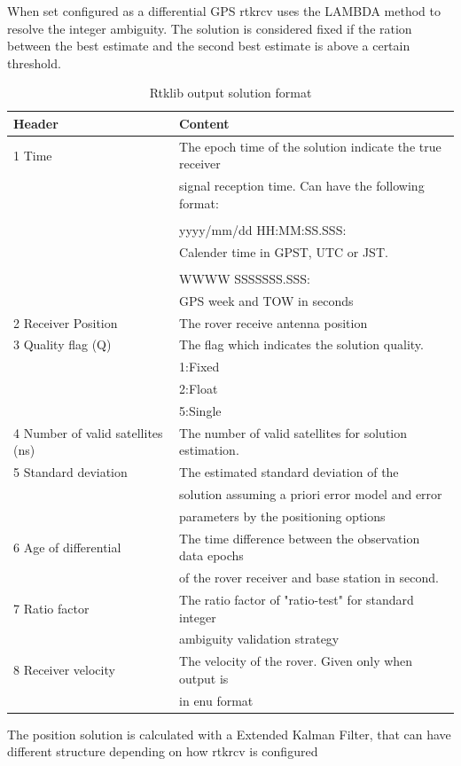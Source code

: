 When set configured as a differential GPS rtkrcv uses the LAMBDA method to resolve the integer ambiguity. The solution is considered fixed if the ration between the best estimate and the second best estimate is above a certain threshold.
\begin{table}[!h]
\begin{center}
    \begin{tabular}{ | l | l |}
    \hline
    \textbf{Header} & \textbf{Content} \\ \hline
     1 Time & The epoch time of the solution indicate the true receiver\\& signal reception time. Can have the following format:\\&\\& yyyy/mm/dd HH:MM:SS.SSS:\\& Calender time in GPST, UTC or JST.\\&\\&
     
     WWWW SSSSSSS.SSS:\\&
     GPS week and TOW in seconds  \\ \hline
     2 Receiver Position & The rover receive antenna position \\ \hline
     3 Quality flag (Q) & The flag which indicates the solution quality.\\& 1:Fixed\\& 2:Float\\& 5:Single \\ \hline
     4 Number of valid satellites (ns) & The number of valid satellites for solution estimation. \\ \hline
     5 Standard deviation & The estimated standard deviation of the\\& solution assuming a priori error model and error\\& parameters by the positioning options \\ \hline
     6 Age of differential & The time difference between the observation data epochs\\& of the rover receiver and base station in second. \\ \hline
     7 Ratio factor & The ratio factor of "ratio-test" for standard integer\\& ambiguity validation strategy \\ \hline
     8 Receiver velocity & The velocity of the rover. Given only when output is\\& in enu format \\ \hline
    \end{tabular}
\end{center}
\caption{Rtklib output solution format }
\label{Tb:RtklibOutput}
\end{table}
The position solution is calculated with a Extended Kalman Filter, that can have different structure depending on how rtkrcv is configured
